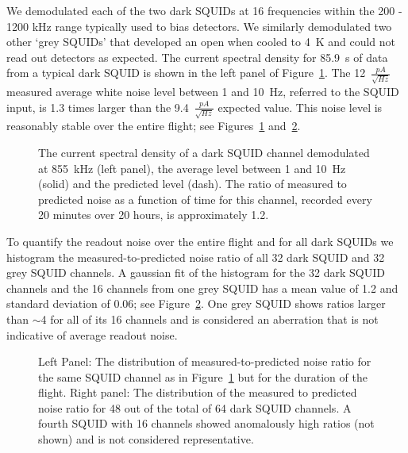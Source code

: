 \documentclass[../EBEXPaper2.tex]{subfiles}
\begin{document}
We demodulated each of the two dark \ac{SQUID}s at 16 frequencies within the 200 - 1200 kHz range typically used to bias detectors.
We similarly demodulated two other `grey \ac{SQUID}s' that developed an open when cooled to 4~K and could not read out detectors as expected.
The current spectral density for 85.9~s of data from a typical dark \ac{SQUID} is shown in the left panel of Figure~\ref{fig:squidNoiseSpectrum}.
The 12~$\frac{pA}{\sqrt{Hz}}$ measured average white noise level between 1 and 10~Hz, referred to the \ac{SQUID} input, is 1.3 times larger than the 9.4~$\frac{pA}{\sqrt{Hz}}$ expected value.%
This noise level is reasonably stable over the entire flight; see Figures~\ref{fig:squidNoiseSpectrum} and~\ref{fig:squidNoiseSpectrumDist}. 
\begin{figure}[htbp]
\begin{center}
\caption{The current spectral density of a dark \ac{SQUID} channel demodulated at 855~kHz (left panel), the average level between 1 and 10~Hz (solid) and the predicted level (dash).  
The ratio of measured to predicted noise as a function of time for this channel, recorded every 20 minutes over 20 hours, is approximately 1.2.}
\label{fig:squidNoiseSpectrum}
\end{center}
\end{figure}
To quantify the readout noise over the entire flight and for all dark \ac{SQUID}s 
we histogram the measured-to-predicted noise ratio of all 32 dark \ac{SQUID} and 32 grey \ac{SQUID} channels.
A gaussian fit of the histogram for the 32 dark \ac{SQUID} channels and the 16 channels from one grey \ac{SQUID} has a mean value of 1.2 and standard deviation of 0.06; see Figure~\ref{fig:squidNoiseSpectrumDist}.
One grey \ac{SQUID} shows ratios larger than $\sim$4 for all of its 16 channels and is considered an aberration that is not indicative of average readout noise.  
\begin{figure}[htbp]
\begin{center}
\caption{Left Panel: The distribution of measured-to-predicted noise ratio for the same \ac{SQUID} channel as in Figure~\ref{fig:squidNoiseSpectrum} but for the duration of the flight.
Right panel: The distribution of the measured to predicted noise ratio for 48 out of the total of 64 dark \ac{SQUID}
channels.
A fourth \ac{SQUID} with 16 channels showed anomalously high ratios (not shown) and is not considered representative.  
\label{fig:squidNoiseSpectrumDist} }
\end{center}
\end{figure}
\end{document}
